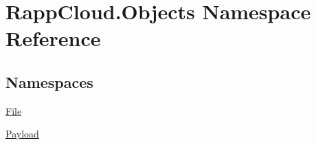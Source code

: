 \hypertarget{namespaceRappCloud_1_1Objects}{\section{Rapp\-Cloud.\-Objects Namespace Reference}
\label{namespaceRappCloud_1_1Objects}
}
\subsection*{Namespaces}
\begin{DoxyCompactItemize}
\item 
\hyperlink{namespaceRappCloud_1_1Objects_1_1File}{File}
\item 
\hyperlink{namespaceRappCloud_1_1Objects_1_1Payload}{Payload}
\end{DoxyCompactItemize}
